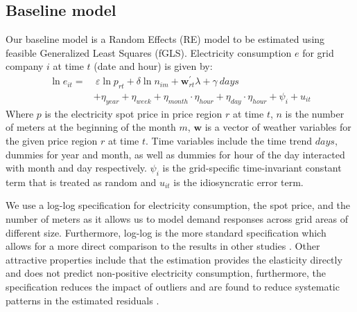\label{sec:empirical}
\subsection{Baseline model}
\label{subsec:model}
Our baseline model is a Random Effects (RE) model to be estimated using feasible Generalized Least Squares (fGLS). Electricity consumption $e$ for grid company $i$ at time $t$ (date and hour) is given by:
\begin{equation}
  \begin{split}
  \ln e_{it}=&\ \varepsilon\ln p_{rt}+\delta\ln n_{im}+\bm{w}^{'}_{rt}\lambda+\gamma\ days\\
  &+\eta_{year}+\eta_{week}+\eta_{month}\cdot\eta_{hour}+\eta_{day}\cdot\eta_{hour}+\psi_i+u_{it}
  \end{split}
  \label{eq:baseline}
\end{equation}
Where $p$ is the electricity spot price in price region $r$ at time $t$, $n$ is the number of meters at the beginning of the month $m$, $\bm{w}$ is a vector of weather variables for the given price region $r$ at time $t$. Time variables include the time trend $days$, dummies for year and month, as well as dummies for hour of the day interacted with month and day respectively. $\psi_i$ is the grid-specific time-invariant constant term that is treated as random and $u_{it}$ is the idiosyncratic error term.
\par
We use a log-log specification for electricity consumption, the spot price, and the number of meters as it allows us to model demand responses across grid areas of different size. Furthermore, log-log is the more standard specification which allows for a more direct comparison to the results in other studies \citep{burke2017price}. Other attractive properties include that the estimation provides the elasticity directly and does not predict non-positive electricity consumption, furthermore, the specification reduces the impact of outliers and are found to reduce systematic patterns in the estimated residuals \citep{burke2017price}. %
\par

